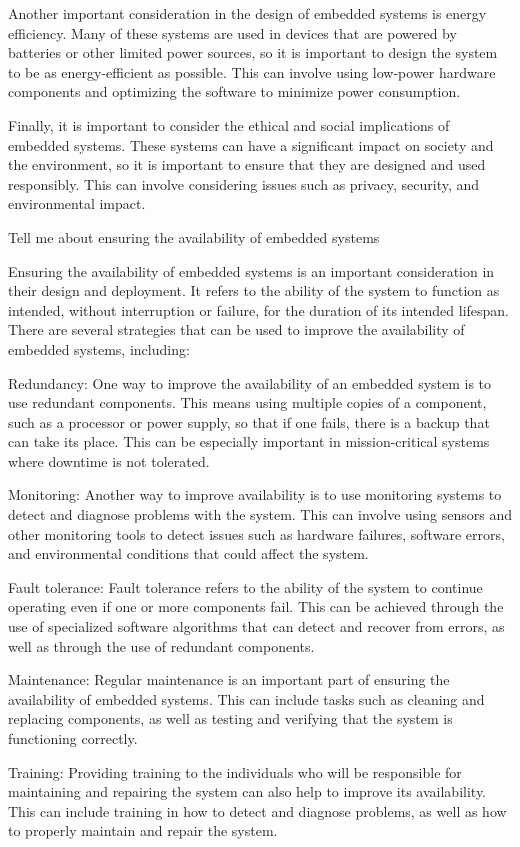     Another important consideration in the design of embedded systems is energy efficiency. Many of these systems are used in devices that are powered by batteries or other limited power sources, so it is important to design the system to be as energy-efficient as possible. This can involve using low-power hardware components and optimizing the software to minimize power consumption.

    Finally, it is important to consider the ethical and social implications of embedded systems. These systems can have a significant impact on society and the environment, so it is important to ensure that they are designed and used responsibly. This can involve considering issues such as privacy, security, and environmental impact.

Tell me about ensuring the availability of embedded systems

Ensuring the availability of embedded systems is an important consideration in their design and deployment. It refers to the ability of the system to function as intended, without interruption or failure, for the duration of its intended lifespan. There are several strategies that can be used to improve the availability of embedded systems, including:

    Redundancy: One way to improve the availability of an embedded system is to use redundant components. This means using multiple copies of a component, such as a processor or power supply, so that if one fails, there is a backup that can take its place. This can be especially important in mission-critical systems where downtime is not tolerated.

    Monitoring: Another way to improve availability is to use monitoring systems to detect and diagnose problems with the system. This can involve using sensors and other monitoring tools to detect issues such as hardware failures, software errors, and environmental conditions that could affect the system.

    Fault tolerance: Fault tolerance refers to the ability of the system to continue operating even if one or more components fail. This can be achieved through the use of specialized software algorithms that can detect and recover from errors, as well as through the use of redundant components.

    Maintenance: Regular maintenance is an important part of ensuring the availability of embedded systems. This can include tasks such as cleaning and replacing components, as well as testing and verifying that the system is functioning correctly.

    Training: Providing training to the individuals who will be responsible for maintaining and repairing the system can also help to improve its availability. This can include training in how to detect and diagnose problems, as well as how to properly maintain and repair the system.